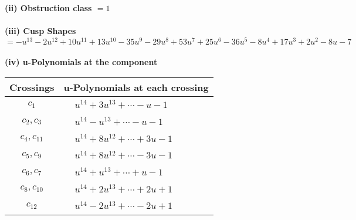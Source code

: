 \documentclass[1p]{elsarticle_modified}
\theoremstyle{definition}
\begin{document}
\flushleft \textbf{(ii) Obstruction class $= 1$}\\~\\
\flushleft \textbf{(iii) Cusp Shapes $= - u^{13}-2 u^{12}+10 u^{11}+13 u^{10}-35 u^9-29 u^8+53 u^7+25 u^6-36 u^5-8 u^4+17 u^3+2 u^2-8 u-7$}\\~\\
\newpage\renewcommand{\arraystretch}{1}
\flushleft \textbf{(iv) u-Polynomials at the component}\newline \\
\begin{tabular}{m{50pt}|m{274pt}}
Crossings & \hspace{64pt}u-Polynomials at each crossing \\
\hline $$\begin{aligned}c_{1}\end{aligned}$$&$\begin{aligned}
&u^{14}+3 u^{13}+\cdots- u-1
\end{aligned}$\\
\hline $$\begin{aligned}c_{2},c_{3}\end{aligned}$$&$\begin{aligned}
&u^{14}- u^{13}+\cdots- u-1
\end{aligned}$\\
\hline $$\begin{aligned}c_{4},c_{11}\end{aligned}$$&$\begin{aligned}
&u^{14}+8 u^{12}+\cdots+3 u-1
\end{aligned}$\\
\hline $$\begin{aligned}c_{5},c_{9}\end{aligned}$$&$\begin{aligned}
&u^{14}+8 u^{12}+\cdots-3 u-1
\end{aligned}$\\
\hline $$\begin{aligned}c_{6},c_{7}\end{aligned}$$&$\begin{aligned}
&u^{14}+u^{13}+\cdots+u-1
\end{aligned}$\\
\hline $$\begin{aligned}c_{8},c_{10}\end{aligned}$$&$\begin{aligned}
&u^{14}+2 u^{13}+\cdots+2 u+1
\end{aligned}$\\
\hline $$\begin{aligned}c_{12}\end{aligned}$$&$\begin{aligned}
&u^{14}-2 u^{13}+\cdots-2 u+1
\end{aligned}$\\
\hline
\end{tabular}\\~\\
\end{document}
